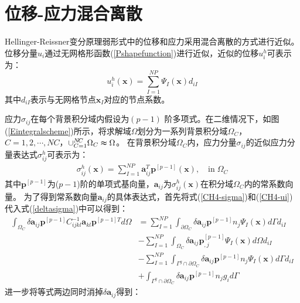 \section{位移-应力混合离散}
Hellinger-Reissner变分原理弱形式中的位移和应力采用混合离散的方式进行近似。
位移分量$u_i$通过无网格形函数(\ref{Pshapefunction})进行近似，近似的位移$u^h_i$可表示为：
\begin{equation}\label{CH4-ui}
    u^h_i(\pmb{x})=\sum_{I=1}^{N\!P}\Psi_I(\pmb{x})d_{iI}
\end{equation}
其中$d_{iI}$表示与无网格节点$\pmb{x}_I$对应的节点系数。\par
应力$\sigma_{ij}$在每个背景积分域内假设为$(p-1)$ 阶多项式。在二维情况下，如图(\ref{Eintegralscheme})所示，将求解域$\Omega$划分为一系列背景积分域$\Omega_C$，$C=1,2,\dotsb,N\!C$，$\cup_{C=1}^{N\!C}\Omega_C\thickapprox\Omega$。
在背景积分域$\Omega_C$内，应力分量$\sigma_{ij}$的近似应力分量表达式$\sigma^h_{ij}$可表示为：
\begin{equation}\label{CH4-sigma}
\begin{split}
    \sigma^h_{ij}(\pmb{x})=\sum_{I=1}^{N\!P}\pmb{a}_{ij}^T\pmb{p}^{[p-1]}(\pmb{x}),\quad\text{in}\;\Omega_C
\end{split}
\end{equation}
其中$\pmb{p}^{[p-1]}$为($p-1$)阶的单项式基向量，$\pmb{a}_{ij}$为$\sigma_{ij}^h(\pmb{x})$在积分域$\Omega_C$内的常系数向量。
为了得到常系数向量$\pmb{a}_{ij}$的具体表达式，首先将式(\ref{CH4-sigma})和(\ref{CH4-ui})代入式(\ref{deltasigma})中可以得到：
\begin{equation}
\begin{split}
    \int_{\Omega_C}\delta\pmb{a}_{ij}\pmb{p}^{[p-1]}C^{-1}_{ijkl}\pmb{a}_{kl}\pmb{p}^{[p-1]T}d\Omega&=\sum_{I=1}^{N\!P}\int_{\partial\Omega_C}\delta\pmb{a}_{ij}\pmb{p}^{[p-1]}n_j\Psi_I(\pmb{x})d\Gamma d_{iI}\\
    &-\sum_{I=1}^{N\!P}\int_{\Omega_C}\delta\pmb{a}_{ij}\pmb{p}_{,j}^{[p-1]}\Psi_{I}(\pmb{x})d\Omega d_{iI}\\
     &-\sum_{I=1}^{N\!P}\int_{\Gamma^g\cap\partial\Omega_C}\delta\pmb{a}_{ij}\pmb{p}^{[p-1]}n_j\Psi_I(\pmb{x})d\Gamma d_{iI}\\
     &+\int_{\Gamma^g\cap\partial\Omega_C}\delta\pmb{a}_{ij}\pmb{p}^{[p-1]}n_jg_id\Gamma
\end{split}
\end{equation}
进一步将等式两边同时消掉$\delta\pmb{a}_{ij}$得到：
